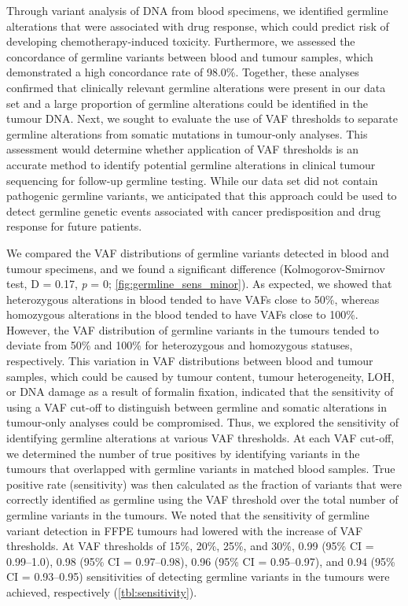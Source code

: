 Through variant analysis of DNA from blood specimens, we identified germline alterations that were associated with drug response, which could predict risk of developing chemotherapy-induced toxicity. Furthermore, we assessed the concordance of germline variants between blood and tumour samples, which demonstrated a high concordance rate of 98.0\%. Together, these analyses confirmed that clinically relevant germline alterations were present in our data set and a large proportion of germline alterations could be identified in the tumour DNA. Next, we sought to evaluate the use of VAF thresholds to separate germline alterations from somatic mutations in tumour-only analyses. This assessment would determine whether application of VAF thresholds is an accurate method to identify potential germline alterations in clinical tumour sequencing for follow-up germline testing. While our data set did not contain pathogenic germline variants, we anticipated that this approach could be used to detect germline genetic events associated with cancer predisposition and drug response for future patients.

We compared the VAF distributions of germline variants detected in blood and tumour specimens, and we found a significant difference (Kolmogorov-Smirnov test, D = 0.17, \textit{p} = 0; \autoref{fig:germline_sens_minor}). As expected, we showed that heterozygous alterations in blood tended to have VAFs close to 50\%, whereas homozygous alterations in the blood tended to have VAFs close to 100\%. However, the VAF distribution of germline variants in the tumours tended to deviate from 50\% and 100\% for heterozygous and homozygous statuses, respectively. This variation in VAF distributions between blood and tumour samples, which could be caused by tumour content, tumour heterogeneity, LOH, or DNA damage as a result of formalin fixation, indicated that the sensitivity of using a VAF cut-off to distinguish between germline and somatic alterations in tumour-only analyses could be compromised. Thus, we explored the sensitivity of identifying germline alterations at various VAF thresholds. At each VAF cut-off, we determined the number of true positives by identifying variants in the tumours that overlapped with germline variants in matched blood samples. True positive rate (sensitivity) was then calculated as the fraction of variants that were correctly identified as germline using the VAF threshold over the total number of germline variants in the tumours. We noted that the sensitivity of germline variant detection in FFPE tumours had lowered with the increase of VAF thresholds. At VAF thresholds of 15\%, 20\%, 25\%, and 30\%, 0.99 (95\% CI = 0.99--1.0), 0.98 (95\% CI = 0.97--0.98), 0.96 (95\% CI = 0.95--0.97), and 0.94 (95\% CI = 0.93--0.95) sensitivities of detecting germline variants in the tumours were achieved, respectively (\autoref{tbl:sensitivity}).

